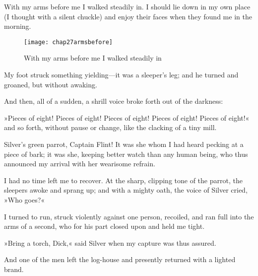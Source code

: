 With my arms before me I walked steadily in. I should lie down in my own place (I thought with a silent chuckle) and enjoy their faces when they found me in the morning.

   \begin{figure}[p]
\centering
\texttt{[image: chap27armsbefore]}
\caption{With my arms before me I walked steadily in}
\end{figure} 

My foot struck something yielding—it was a sleeper's leg; and he turned and groaned, but without awaking.

And then, all of a sudden, a shrill voice broke forth out of the darkness:

»Pieces of eight! Pieces of eight! Pieces of eight! Pieces of eight! Pieces of eight!« and so forth, without pause or change, like the clacking of a tiny mill.

Silver's green parrot, Captain Flint! It was she whom I had heard pecking at a piece of bark; it was she, keeping better watch than any human being, who thus announced my arrival with her wearisome refrain.

I had no time left me to recover. At the sharp, clipping tone of the parrot, the sleepers awoke and sprang up; and with a mighty oath, the voice of Silver cried, »Who goes?«

I turned to run, struck violently against one person, recoiled, and ran full into the arms of a second, who for his part closed upon and held me tight.

»Bring a torch, Dick,« said Silver when my capture was thus assured.

And one of the men left the log-house and presently returned with a lighted brand.